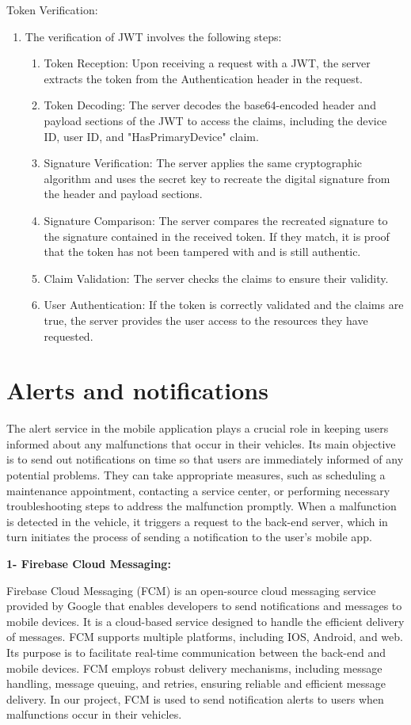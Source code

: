 \documentclass[
12pt,
oneside, 
onehalfspacing, 
nolistspacing, 
parskip, 
chapterinoneline, 
]{AASTCOMPUTER}
\begin{document}
Token Verification:
\begin{enumerate}
\item The verification of JWT involves the following steps:
\begin{enumerate}
\item Token Reception: Upon receiving a request with a JWT, the server extracts the token from the Authentication header in the request.
\item Token Decoding: The server decodes the base64-encoded header and payload sections of the JWT to access the claims, including the device ID, user ID, and "HasPrimaryDevice" claim.
\item Signature Verification: The server applies the same cryptographic algorithm and uses the secret key to recreate the digital signature from the header and payload sections.
\item Signature Comparison: The server compares the recreated signature to the signature contained in the received token. If they match, it is proof that the token has not been tampered with and is still authentic.
\item Claim Validation: The server checks the claims to ensure their validity.
\item User Authentication: If the token is correctly validated and the claims are true, the server provides the user access to the resources they have requested.
\end{enumerate}
\end{enumerate}

\section{Alerts and notifications}
The alert service in the mobile application plays a crucial role in keeping users informed about any malfunctions that occur in their vehicles. Its main objective is to send out notifications on time so that users are immediately informed of any potential problems. They can take appropriate measures, such as scheduling a maintenance appointment, contacting a service center, or performing necessary troubleshooting steps to address the malfunction promptly. When a malfunction is detected in the vehicle, it triggers a request to the back-end server, which in turn initiates the process of sending a notification to the user's mobile app.

\textbf{1- Firebase Cloud Messaging:}

Firebase Cloud Messaging (FCM) is an open-source cloud messaging service provided by Google that enables developers to send notifications and messages to mobile devices. It is a cloud-based service designed to handle the efficient delivery of messages. FCM supports multiple platforms, including IOS, Android, and web. Its purpose is to facilitate real-time communication between the back-end and mobile devices. FCM employs robust delivery mechanisms, including message handling, message queuing, and retries, ensuring reliable and efficient message delivery. In our project, FCM is used to send notification alerts to users when malfunctions occur in their vehicles.
\end{document}
